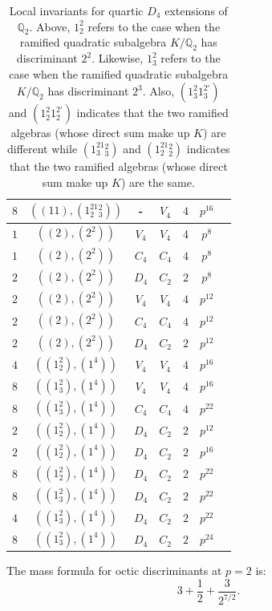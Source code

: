 \documentclass[10pt]{article}
\theoremstyle{plain}
\theoremstyle{definition}
\theoremstyle{remark}
\def\Q{{\mathbb Q}}
\def\Q{{\mathbb Q}}
\def\bQ{{\mathbb Q}}
\def\bQ{{\mathbb Q}}
\begin{document}
\begin{table}
\begin{tabular}{|c|c|c|c|c|c|c|}
$8$ & $((11),(1_2^21_3^2))$  & -   & $V_4$  & $4$ & $p^{16}$\\
\hline
$1$ & $((2),(2^2))$      & $V_4$   &  $V_4$  & $4$ & $p^8$\\
$1$ & $((2),(2^2))$      & $C_4$   &  $C_4$  & $4$ & $p^8$\\
$2$ & $((2),(2^2))$      & $D_4$   &  $C_2$  & $2$ & $p^8$\\
$2$ & $((2),(2^2))$      & $V_4$   &  $V_4$  & $4$ & $p^{12}$\\
$2$ & $((2),(2^2))$      & $C_4$   &  $C_4$  & $4$ & $p^{12}$ \\
$2$ & $((2),(2^2))$      & $D_4$   &  $C_2$  & $2$ & $p^{12}$ \\
\hline
$4$ & $((1_2^2),(1^4))$    & $V_4$   &  $V_4$  & $4$ & $p^{16}$\\
$8$ & $((1_3^2),(1^4))$    & $V_4$   &  $V_4$  & $4$ & $p^{16}$\\
$8$ & $((1_3^2),(1^4))$    & $C_4$   &  $C_4$  & $4$ & $p^{22}$\\

$2$ & $((1_2^2),(1^4))$    & $D_4$   &  $C_2$  & $2$ & $p^{12}$\\
$2$ & $((1_2^2),(1^4))$    & $D_4$   &  $C_2$  & $2$ & $p^{16}$\\
$8$ & $((1_2^2),(1^4))$    & $D_4$   &  $C_2$  & $2$ & $p^{22}$\\
$8$ & $((1_3^2),(1^4))$    & $D_4$   &  $C_2$  & $2$ & $p^{22}$\\

$4$ & $((1_3^2),(1^4))$    & $D_4$   &  $C_2$  & $2$ & $p^{22}$\\
$8$ & $((1_3^2),(1^4))$    & $D_4$   &  $C_2$  & $2$ & $p^{24}$\\
\hline
\end{tabular}
\caption{Local invariants for quartic $D_4$ extensions of $\Q_2$. 
Above, $1^2_2$ refers to the case when the ramified quadratic subalgebra $K/\bQ_2$ has discriminant $2^2$. Likewise, $1^2_3$ refers to the case when the ramified quadratic subalgebra $K/\bQ_2$ has discriminant $2^3$. Also, 
$(1^2_3 1^{2'}_3)$ and $(1^2_2 1^{2'}_2)$ 
indicates that the two ramified algebras (whose direct sum make up $K$) are different while $(1_3^21_3^2)$ and $(1_2^21_2^2)$ indicates that the two ramified algebras (whose direct sum make up $K$) are the same.
}\label{tab:2}
\end{table}
The mass formula for octic discriminants at $p = 2$ is:
$$3 + \frac{1}{2} + \frac{3}{2^{7/2}}.$$

 





\end{document}
